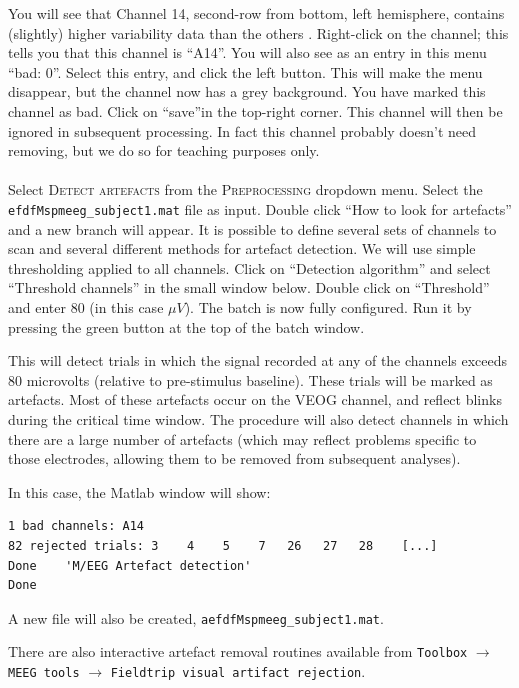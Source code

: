 You will see that Channel 14, second-row from bottom, left hemisphere, contains (slightly) higher variability data than the others .
Right-click on the channel; this tells you that this channel is ``A14''. You will also see as an entry in this menu ``bad: 0''. Select this entry, and click the left button. This will make the menu disappear, but the channel now has a grey background. You have marked this channel as bad. Click on ``save''in the top-right corner. This channel will then be ignored in subsequent processing. In fact this channel probably doesn't need removing, but we do so for teaching purposes only.
\\
\\
Select \textsc{Detect artefacts} from the \textsc{Preprocessing} dropdown menu. Select the \texttt{efdfMspmeeg\_subject1.mat} file as input.  Double click ``How to look for artefacts'' and a new branch will appear. It is possible to define several sets of channels to scan and several different methods for artefact detection. We will use simple thresholding applied to all channels. Click on ``Detection algorithm'' and select ``Threshold channels'' in the small window below. Double click on ``Threshold'' and enter 80 (in this case $\mu V$). The batch is now fully configured. Run it by pressing the green button at the top of the batch window. 

This will detect trials in which the signal recorded at any of the channels exceeds 80 microvolts (relative to pre-stimulus baseline). These trials will be marked as artefacts. Most of these artefacts occur on the VEOG channel, and reflect blinks during the critical time window. The procedure will also detect channels in which there are a large number of artefacts (which may reflect problems specific to those electrodes, allowing them to be removed from subsequent analyses).

In this case, the Matlab window will show:
\begin{verbatim}
1 bad channels: A14 
82 rejected trials: 3    4    5    7   26   27   28    [...]
Done    'M/EEG Artefact detection'
Done
\end{verbatim}
A new file will also be created, \texttt{aefdfMspmeeg\_subject1.mat}.

There are also interactive artefact removal routines available from \texttt{Toolbox} $\rightarrow$ \texttt{MEEG tools} $\rightarrow$  \texttt{Fieldtrip visual artifact rejection}.

